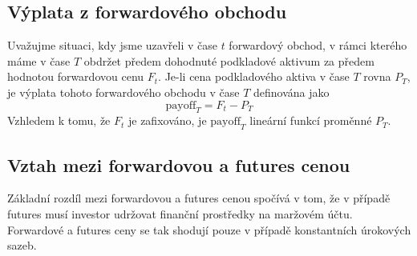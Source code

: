 \documentclass[a4paper]{book}
\begin{document}
\subsection{Výplata z forwardového obchodu}

Uvažujme situaci, kdy jsme uzavřeli v čase $t$ forwardový obchod, v rámci kterého máme v čase $T$ obdržet předem dohodnuté podkladové aktivum za předem hodnotou forwardovou cenu $F_t$. Je-li cena podkladového aktiva v čase $T$ rovna $P_T$, je výplata tohoto forwardového obchodu v čase $T$ definována jako
\begin{equation*}
\mathrm{payoff}_T = F_t - P_T
\end{equation*}
Vzhledem k tomu, že $F_t$ je zafixováno, je $\mathrm{payoff}_T$ lineární funkcí proměnné $P_T$.

\subsection{Vztah mezi forwardovou a futures cenou}

Základní rozdíl mezi forwardovou a futures cenou spočívá v tom, že v případě futures musí investor udržovat finanční prostředky na maržovém účtu. Forwardové a futures ceny se tak shodují pouze v případě konstantních úrokových sazeb.\\
\end{document}
